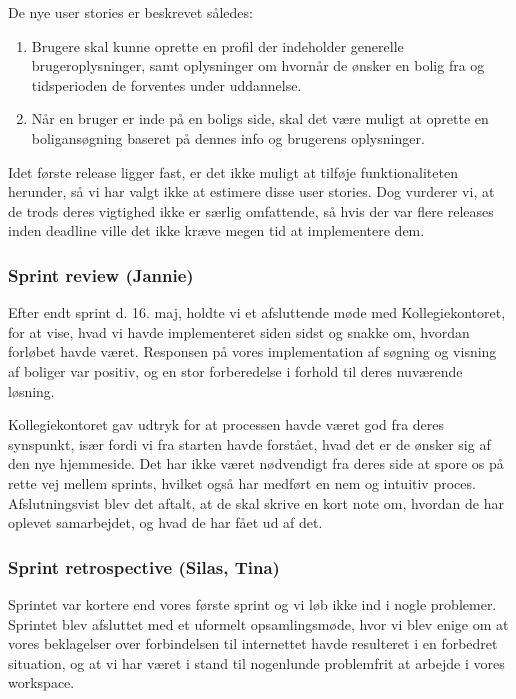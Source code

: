 \documentclass[12pt, a4paper]{report}
\begin{document}
De nye user stories er beskrevet således:

\begin{enumerate}

\item Brugere skal kunne oprette en profil der indeholder generelle brugeroplysninger, samt oplysninger om hvornår de ønsker en bolig fra og tidsperioden de forventes under uddannelse.

\item Når en bruger er inde på en boligs side, skal det være muligt at oprette en boligansøgning baseret på dennes info og brugerens oplysninger.

\end{enumerate}

Idet første release ligger fast, er det ikke muligt at tilføje funktionaliteten herunder, så vi har valgt ikke at estimere disse user stories. Dog vurderer vi, at de trods deres vigtighed ikke er særlig omfattende, så hvis der var flere releases inden deadline ville det ikke kræve megen tid at implementere dem.

\subsubsection{Sprint review (Jannie)}

Efter endt sprint d. 16. maj, holdte vi et afsluttende møde med Kollegiekontoret, for at vise, hvad vi havde implementeret siden sidst og snakke om, hvordan forløbet havde været. Responsen på vores implementation af søgning og visning af boliger var positiv, og en stor forberedelse i forhold til deres nuværende løsning.

Kollegiekontoret gav udtryk for at processen havde været god fra deres synspunkt, især fordi vi fra starten havde forstået, hvad det er de ønsker sig af den nye hjemmeside. Det har ikke været nødvendigt fra deres side at spore os på rette vej mellem sprints, hvilket også har medført en nem og intuitiv proces. Afslutningsvist blev det aftalt, at de skal skrive en kort note om, hvordan de har oplevet samarbejdet, og hvad de har fået ud af det.

\subsubsection{Sprint retrospective (Silas, Tina)}

Sprintet var kortere end vores første sprint og vi løb ikke ind i nogle problemer. Sprintet blev afsluttet med et uformelt opsamlingsmøde, hvor vi blev enige om at vores beklagelser over forbindelsen til internettet havde resulteret i en forbedret situation, og at vi har været i stand til nogenlunde problemfrit at arbejde i vores workspace.
\end{document}
